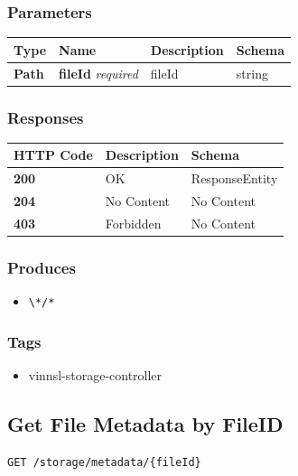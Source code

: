 \subsubsection{Parameters}\label{parameters-16}

\begin{longtable}[]{@{}llll@{}}
\toprule
Type & Name & Description & Schema\tabularnewline
\midrule
\endhead
\textbf{Path} & \textbf{fileId} \emph{required} & fileId &
string\tabularnewline
\bottomrule
\end{longtable}

\subsubsection{Responses}\label{responses-19}

\begin{longtable}[]{@{}lll@{}}
\toprule
HTTP Code & Description & Schema\tabularnewline
\midrule
\endhead
\textbf{200} & OK & ResponseEntity\tabularnewline
\textbf{204} & No Content & No Content\tabularnewline
\textbf{403} & Forbidden & No Content\tabularnewline
\bottomrule
\end{longtable}

\subsubsection{Produces}\label{produces-19}

\begin{itemize}
\tightlist
\item
  \texttt{\textbackslash{}*/*}
\end{itemize}

\subsubsection{Tags}\label{tags-19}

\begin{itemize}
\tightlist
\item
  vinnsl-storage-controller
\end{itemize}

\subsection{Get File Metadata by
FileID}\label{get-file-metadata-by-fileid}

\begin{verbatim}
GET /storage/metadata/{fileId}
\end{verbatim}

